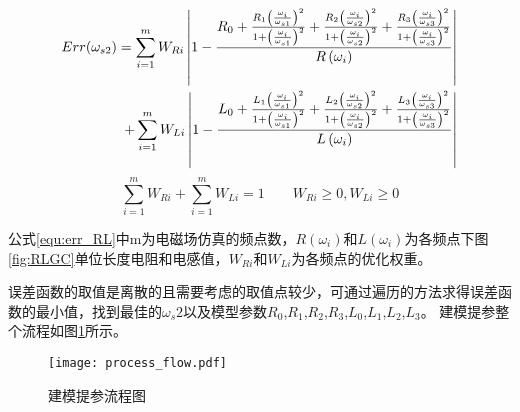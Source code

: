 \begin{align}\label{equ:err_RL}
Err({\omega _{s2}}) =\sum\limits_{i = 1}^m {{W_{Ri}}} \left| {1 - \frac{{{R_0} + \frac{{{R_1}{{\left( {\frac{{{\omega _i}}}{{{\omega _{s1}}}}} \right)}^2}}}{{1 + {{\left( {\frac{{{\omega _i}}}{{{\omega _{s1}}}}} \right)}^2}}} + \frac{{{R_2}{{\left( {\frac{{{\omega _i}}}{{{\omega _{s2}}}}} \right)}^2}}}{{1 + {{\left( {\frac{{{\omega _i}}}{{{\omega _{s2}}}}} \right)}^2}}} + \frac{{{R_3}{{\left( {\frac{{{\omega _i}}}{{{\omega _{s3}}}}} \right)}^2}}}{{1 + {{\left( {\frac{{{\omega _i}}}{{{\omega _{s3}}}}} \right)}^2}}}}}{{R\left( {{\omega _i}} \right)}}} \right|  & \notag \\
+\sum\limits_{i = 1}^m {{W_{Li}}} \left| {1 - \frac{{{L_0} + \frac{{{L_1}{{\left( {\frac{{{\omega _i}}}{{{\omega _{s1}}}}} \right)}^2}}}{{1 + {{\left( {\frac{{{\omega _i}}}{{{\omega _{s1}}}}} \right)}^2}}} + \frac{{{L_2}{{\left( {\frac{{{\omega _i}}}{{{\omega _{s2}}}}} \right)}^2}}}{{1 + {{\left( {\frac{{{\omega _i}}}{{{\omega _{s2}}}}} \right)}^2}}} + \frac{{{L_3}{{\left( {\frac{{{\omega _i}}}{{{\omega _{s3}}}}} \right)}^2}}}{{1 + {{\left( {\frac{{{\omega _i}}}{{{\omega _{s3}}}}} \right)}^2}}}}}{{L\left( {{\omega _i}} \right)}}} \right| &
\end{align}
\begin{equation}\label{equ:weight}
  \sum_{i=1}^{m}W_{Ri}+\sum_{i=1}^{m}W_{Li}=1 \qquad    W_{Ri}\geq0,W_{Li}\geq0
\end{equation}

公式\ref{equ:err_RL}中m为电磁场仿真的频点数，$R(\omega_i)$和$L(\omega_i)$为各频点下图 \ref{fig:RLGC}单位长度电阻和电感值，$W_{Ri}$和$W_{Li}$为各频点的优化权重。
\par
误差函数的取值是离散的且需要考虑的取值点较少，可通过遍历的方法求得误差函数的最小值，找到最佳的$\omega_s2$以及模型参数$R_0$,$R_1$,$R_2$,$R_3$,$L_0$,$L_1$,$L_2$,$L_3$。
建模提参整个流程如图\ref{fig:process_flow}所示。
\begin{figure}[htb]
  \centering
  \texttt{[image: process\_flow.pdf]}
  \caption{建模提参流程图}\label{fig:process_flow}
\end{figure}
